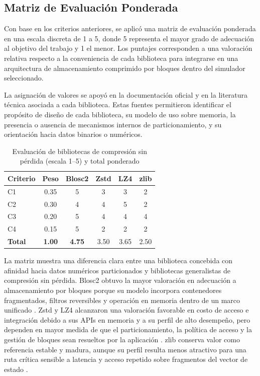 \subsection{Matriz de Evaluación Ponderada}

Con base en los criterios anteriores, se aplicó una matriz de evaluación ponderada en una
escala discreta de 1 a 5, donde 5 representa el mayor grado de adecuación al objetivo del
trabajo y 1 el menor. Los puntajes corresponden a una valoración relativa respecto a la
conveniencia de cada biblioteca para integrarse en una arquitectura de almacenamiento
comprimido por bloques dentro del simulador seleccionado.

La asignación de valores se apoyó en la documentación oficial y en la literatura técnica
asociada a cada biblioteca. Estas fuentes permitieron identificar el propósito de diseño de
cada biblioteca, su modelo de uso sobre memoria, la presencia o ausencia de mecanismos
internos de particionamiento, y su orientación hacia datos binarios o numéricos.

\begin{table}[H]
    \centering
    \caption{Evaluación de bibliotecas de compresión sin pérdida (escala 1--5) y total ponderado}
    \label{tab:evaluacion_bibliotecas}
    \begin{tabular}{lccccc}
        \hline
        \textbf{Criterio} & \textbf{Peso} & \textbf{Blosc2} & \textbf{Zstd} & \textbf{LZ4} & \textbf{zlib} \\
        \hline
        C1 & 0.35 & 5 & 3 & 3 & 2 \\
        C2 & 0.30 & 4 & 4 & 5 & 2 \\
        C3 & 0.20 & 5 & 4 & 4 & 4 \\
        C4 & 0.15 & 5 & 2 & 2 & 2 \\
        \hline
        \textbf{Total} & \textbf{1.00} & \textbf{4.75} & 3.50 & 3.65 & 2.50 \\
        \hline
    \end{tabular}
\end{table}

La matriz muestra una diferencia clara entre una biblioteca concebida con afinidad hacia
datos numéricos particionados y bibliotecas generalistas de compresión sin pérdida.
Blosc2 obtuvo la mayor valoración en adecuación a almacenamiento por bloques porque
su modelo incorpora contenedores fragmentados, filtros reversibles y operación en
memoria dentro de un marco unificado \parencite{blosc2_docs}. Zstd y LZ4 alcanzaron una
valoración favorable en costo de acceso e integración debido a sus APIs en memoria y a
su perfil de alto desempeño, pero dependen en mayor medida de que el particionamiento,
la política de acceso y la gestión de bloques sean resueltos por la aplicación
\parencite{ZstdRepo, ZstdSite, LZ4Repo}. zlib conserva valor como referencia estable y madura,
aunque su perfil resulta menos atractivo para una ruta crítica sensible a latencia y acceso
repetido sobre fragmentos del vector de estado \parencite{ZlibTechDetails}.

